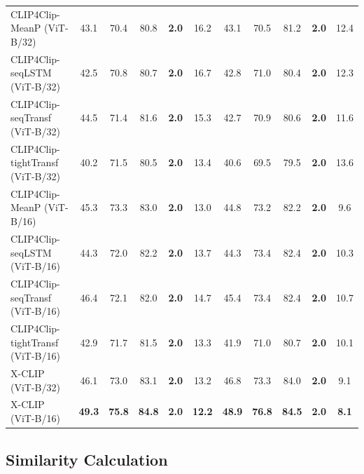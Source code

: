 \documentclass[sigconf]{acmart}
\begin{document}
\begin{table}[]
\begin{tabular}{l|ccccc|ccccc}
CLIP4Clip-MeanP (ViT-B/32) \cite{luo2021clip4clip}  & 43.1          & 70.4          & 80.8          & \textbf{2.0} & 16.2          & 43.1          & 70.5          & 81.2          & \textbf{2.0} & 12.4          \\ 
CLIP4Clip-seqLSTM (ViT-B/32) \cite{luo2021clip4clip}  & 42.5          & 70.8          & 80.7          & \textbf{2.0} & 16.7          & 42.8          & 71.0          & 80.4          & \textbf{2.0} & 12.3          \\ 
CLIP4Clip-seqTransf (ViT-B/32) \cite{luo2021clip4clip}  & 44.5          & 71.4          & 81.6          & \textbf{2.0} & 15.3          & 42.7          & 70.9          & 80.6          & \textbf{2.0} & 11.6          \\ 
CLIP4Clip-tightTransf (ViT-B/32) \cite{luo2021clip4clip}  & 40.2          & 71.5          & 80.5          & \textbf{2.0} & 13.4          & 40.6          & 69.5          & 79.5          & \textbf{2.0} & 13.6          \\ 
CLIP4Clip-MeanP (ViT-B/16) \cite{luo2021clip4clip}  & 45.3 & 73.3 & 83.0 & \textbf{2.0} & 13.0 & 44.8 & 73.2 & 82.2 & \textbf{2.0} & 9.6  \\    
CLIP4Clip-seqLSTM (ViT-B/16) \cite{luo2021clip4clip}  & 44.3 & 72.0 & 82.2 & \textbf{2.0} & 13.7 & 44.3 & 73.4 & 82.4 & \textbf{2.0} & 10.3  \\   
CLIP4Clip-seqTransf (ViT-B/16) \cite{luo2021clip4clip}  & 46.4 & 72.1 & 82.0 & \textbf{2.0} & 14.7 & 45.4 & 73.4 & 82.4 & \textbf{2.0} & 10.7  \\  
CLIP4Clip-tightTransf (ViT-B/16) \cite{luo2021clip4clip}  & 42.9 & 71.7 & 81.5 & \textbf{2.0} & 13.3 & 41.9 & 71.0 & 80.7 & \textbf{2.0} & 10.1 
\\ \hline
X-CLIP (ViT-B/32)         & 46.1          & 73.0          & 83.1          & \textbf{2.0} & 13.2          & 46.8          & 73.3          & 84.0          & \textbf{2.0} & 9.1          \\
X-CLIP (ViT-B/16) & \textbf{49.3} & \textbf{75.8} & \textbf{84.8} & \textbf{2.0} & \textbf{12.2} & \textbf{48.9} & \textbf{76.8} & \textbf{84.5} & \textbf{2.0} & \textbf{8.1} \\ \hline
\end{tabular}
\label{tab:mstvtt_performance}
\end{table}

\subsection{Similarity Calculation} \label{sec:similarity}
\end{document}
